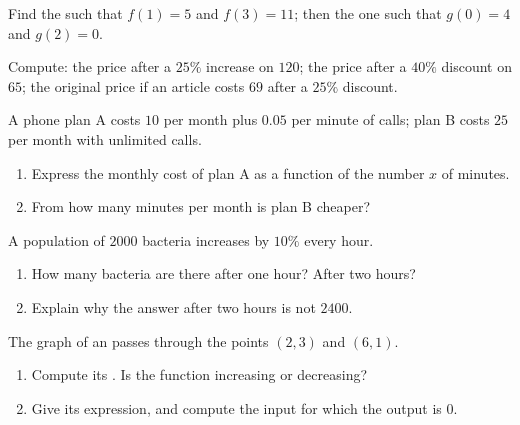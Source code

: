 \begin{exercise}[$\star$]\label{exo:g9:linfunc:5}
Find the  such that $f(1) = 5$ and $f(3) = 11$; then the
one such that $g(0) = 4$ and $g(2) = 0$.
\end{exercise}

\begin{exercise}[$\star\star$]\label{exo:g9:linfunc:6}
Compute: the price after a $25\%$ increase on $120$; the price after a
$40\%$ discount on $65$; the original price if an article costs $69$
after a $25\%$ discount.
\end{exercise}

\begin{exercise}[$\star\star$]\label{exo:g9:linfunc:7}
A phone plan A costs $10$ per month plus $0.05$ per minute of calls; plan
B costs $25$ per month with unlimited calls.
\begin{enumerate}
  \item Express the monthly cost of plan A as a function of the number
        $x$ of minutes.
  \item From how many minutes per month is plan B cheaper?
\end{enumerate}
\end{exercise}

\begin{exercise}[$\star\star$]\label{exo:g9:linfunc:8}
A population of $2000$ bacteria increases by $10\%$ every hour.
\begin{enumerate}
  \item How many bacteria are there after one hour? After two hours?
  \item Explain why the answer after two hours is not $2400$.
\end{enumerate}
\end{exercise}

\begin{exercise}[$\star\star$]\label{exo:g9:linfunc:9}
The graph of an  passes through the points $(2, 3)$ and
$(6, 1)$.
\begin{enumerate}
  \item Compute its . Is the function increasing or decreasing?
  \item Give its expression, and compute the input for which the output
        is $0$.
\end{enumerate}
\end{exercise}

